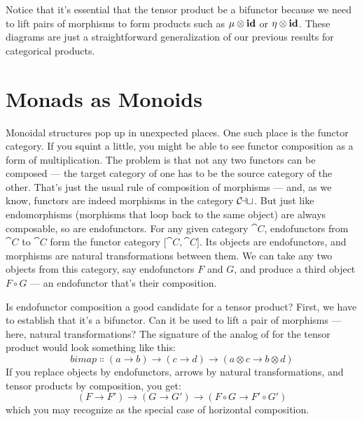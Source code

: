 \noindent
Notice that it's essential that the tensor product be a bifunctor
because we need to lift pairs of morphisms to form products such as
$\mu \otimes \mathbf{id}$ or $\eta \otimes \mathbf{id}$. These diagrams are just a
straightforward generalization of our previous results for categorical
products.

\section{Monads as Monoids}

Monoidal structures pop up in unexpected places. One such place is the
functor category. If you squint a little, you might be able to see
functor composition as a form of multiplication. The problem is that not
any two functors can be composed --- the target category of one has to
be the source category of the other. That's just the usual rule of
composition of morphisms --- and, as we know, functors are indeed
morphisms in the category $\mathcal{C\mkern-3mu at}$. But just like endomorphisms
(morphisms that loop back to the same object) are always composable, so
are endofunctors. For any given category $\cat{C}$, endofunctors from
$\cat{C}$ to $\cat{C}$ form the functor category ${[}\cat{C}, \cat{C}{]}$. Its
objects are endofunctors, and morphisms are natural transformations
between them. We can take any two objects from this category, say
endofunctors $F$ and $G$, and produce a third object $F \circ G$ ---
an endofunctor that's their composition.

Is endofunctor composition a good candidate for a tensor product? First,
we have to establish that it's a bifunctor. Can it be used to lift a
pair of morphisms --- here, natural transformations? The signature of
the analog of  for the tensor product would look something
like this:
\[bimap \Colon (a \to b) \to (c \to d) \to (a \otimes c \to b \otimes d)\]
If you replace objects by endofunctors, arrows by natural
transformations, and tensor products by composition, you get:
\[(F \to F') \to (G \to G') \to (F \circ G \to F' \circ G')\]
which you may recognize as the special case of horizontal composition.

\begin{figure}[H]
\centering
{}
\end{figure}

